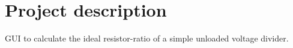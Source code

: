 \section*{Project description}

G\+UI to calculate the ideal resistor-\/ratio of a simple unloaded voltage divider. 